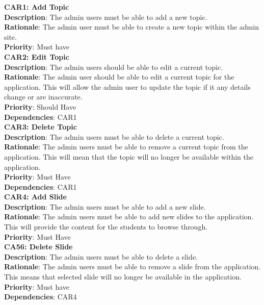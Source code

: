 \documentclass{l3proj}
\begin{document}
\textbf{CAR1: Add Topic}\\
\textbf{Description}:  The admin users must be able to add a new topic. \\
\textbf{Rationale}: The admin user must be able to create a new topic within the admin site. \\
\textbf{Priority}: Must have\\


\textbf{CAR2: Edit Topic}\\
\textbf{Description}: The admin users should be able to edit a current topic.\\
\textbf{Rationale}: The admin user should be able to edit a current topic for the application. This will allow the admin user to update the topic if it any details change or are inaccurate.\\
\textbf{Priority}: Should Have \\
\textbf{Dependencies}: CAR1\\

\textbf{CAR3: Delete Topic}\\
\textbf{Description}: The admin users must be able to delete a current topic. \\
\textbf{Rationale}: The admin users must be able to remove a current topic from the application. This will mean that the topic will no longer be available within the application.\\
\textbf{Priority}: Must Have \\
\textbf{Dependencies}: CAR1\\

\textbf{CAR4: Add Slide}\\
\textbf{Description}:  The admin users must be able to add a new slide. \\
\textbf{Rationale}: The admin users must be able to add new slides to the application. This will provide the content for the students to browse through. \\
\textbf{Priority}: Must Have\\

\textbf{CA56: Delete Slide}\\
\textbf{Description}: The admin users must be able to delete a slide.\\ 
\textbf{Rationale}: The admin users must be able to remove a slide from the application. This means that selected slide will no longer be available in the application.\\
\textbf{Priority}: Must have\\
\textbf{Dependencies}: CAR4\\
\end{document}
